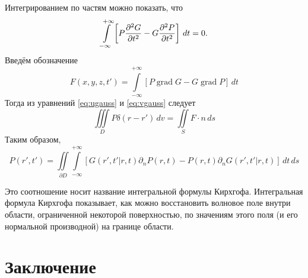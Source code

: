\documentclass[a4paper, fontsize=14pt]{article}
\newcommand{\gradop}{\operatorname{grad}}
\begin{document}
	Интегрированием по частям можно показать, что 
	$$
	\int\limits_{-\infty}^{+\infty}\left[P\diff[2]{G}{t} - G \diff[2]{P}{t}\right]\,dt = 0.
	$$
	Введём обозначение 
	$$
		F(x,y,z,t') = \int\limits_{-\infty}^{+\infty} [P \gradop G - G \gradop P ]\, dt
	$$
	Тогда из уравнений \ref{eq:ugauss} и \ref{eq:vgauss} следует
	\begin{equation}
		\iiint\limits_D P\delta(r-r') \, dv = \iint\limits_S F \cdot n \, ds 
	\end{equation}
Таким образом, 
	\begin{equation}
		P(r',t') = \iint\limits_{\partial D} \int\limits_{-\infty}^{+\infty} 
	[G(r',t'|r,t)\partial_n P(r,t) 
	- P(r,t)\partial_n G(r',t'|r,t)] \,dt\,ds
	\label{eq:kir}
	\end{equation}
	
	
	Это соотношение носит название интегральной формулы Кирхгофа.
	Интегральная
	формула Кирхгофа показывает, как можно восстановить волновое поле внутри области,
	ограниченной некоторой поверхностью, по значениям этого поля (и его нормальной
	производной) на границе области.
	
	
	
	
	
	\clearpage
	
	
	\section*{Заключение} 
	
	\newpage
	
	
	\printbibliography
	
	\newpage
	
	
	
\end{document}
